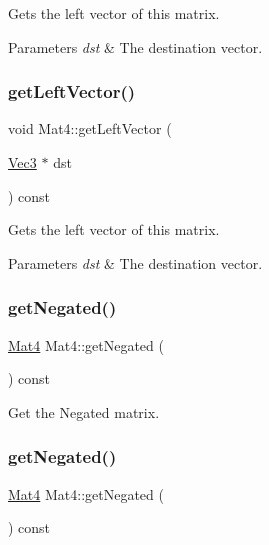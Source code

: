 Gets the left vector of this matrix.


\begin{DoxyParams}{Parameters}
{\em dst} & The destination vector. \\
\hline
\end{DoxyParams}
\mbox{\label{classMat4_a53f91ec013e8a83c5b7a2395e17c626d}} 
\subsubsection{\texorpdfstring{get\+Left\+Vector()}{getLeftVector()}\hspace{0.1cm}{\footnotesize\ttfamily [2/2]}}
{\footnotesize\ttfamily void Mat4\+::get\+Left\+Vector (\begin{DoxyParamCaption}\item[{\hyperlink{classVec3}{Vec3} $\ast$}]{dst }\end{DoxyParamCaption}) const}

Gets the left vector of this matrix.


\begin{DoxyParams}{Parameters}
{\em dst} & The destination vector. \\
\hline
\end{DoxyParams}
\mbox{\label{classMat4_ae500d08f05972355bb6213ad955091e7}} 
\subsubsection{\texorpdfstring{get\+Negated()}{getNegated()}\hspace{0.1cm}{\footnotesize\ttfamily [1/2]}}
{\footnotesize\ttfamily \hyperlink{classMat4}{Mat4} Mat4\+::get\+Negated (\begin{DoxyParamCaption}{ }\end{DoxyParamCaption}) const}

Get the Negated matrix. \mbox{\label{classMat4_ae500d08f05972355bb6213ad955091e7}} 
\subsubsection{\texorpdfstring{get\+Negated()}{getNegated()}\hspace{0.1cm}{\footnotesize\ttfamily [2/2]}}
{\footnotesize\ttfamily \hyperlink{classMat4}{Mat4} Mat4\+::get\+Negated (\begin{DoxyParamCaption}{ }\end{DoxyParamCaption}) const}

